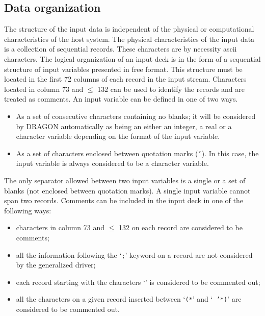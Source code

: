 \subsection{Data organization}\label{sect:DataOrg}

The structure of the input data is independent of the physical or computational
characteristics of the host system. The physical characteristics of the input
data is a collection of sequential records. These characters are by necessity
{\sc ascii} characters. The logical organization of an input deck is in the form
of a sequential structure of input variables presented in free format. This
structure must be located in the first 72 columns of each record in the input
stream. Characters located in column 73 and $\le$ 132 can be used to identify the
records and are treated as comments. An input variable can be defined in one of
two ways.

\begin{itemize}

\item As a set of consecutive characters containing no blanks; it will be
considered by DRAGON automatically as being an either an integer, a real or a
character variable depending on the format of the input variable.

\item As a set of characters enclosed between quotation marks ({\tt '}). In
this case, the input variable is always considered to be a character variable. 

\end{itemize}


The only separator allowed between two input variables is a single or a set of
blanks (not enclosed between quotation marks). A single input variable cannot
span two records. Comments can be included in the input deck in one of the
following ways:


\begin{itemize}

\item  characters in column 73 and $\le$ 132 on each record are considered to be
comments;

\item  all the information following the `{\tt ;}' keyword on a record are not
considered by the generalized driver;

\item  each record starting with the characters `{\tt *}' is considered to be
commented out;

\item  all the characters on a given record inserted between `{\tt (*}' and `{\tt
'*)}' are considered to be commented out.

\end{itemize}


